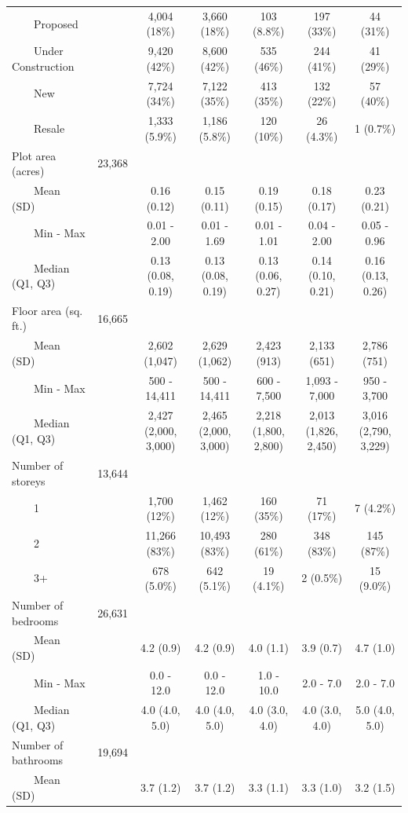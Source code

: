 \documentclass[
  number]{elsarticle}
\begin{document}
\begin{landscape}
\begin{table}
{\begin{tabular*}{\linewidth}{@{\extracolsep{\fill}}lcccccc}
    Proposed &  & 4,004 (18\%) & 3,660 (18\%) & 103 (8.8\%) & 197 (33\%) & 44 (31\%) \\ 
    Under Construction &  & 9,420 (42\%) & 8,600 (42\%) & 535 (46\%) & 244 (41\%) & 41 (29\%) \\ 
    New &  & 7,724 (34\%) & 7,122 (35\%) & 413 (35\%) & 132 (22\%) & 57 (40\%) \\ 
    Resale &  & 1,333 (5.9\%) & 1,186 (5.8\%) & 120 (10\%) & 26 (4.3\%) & 1 (0.7\%) \\ 
Plot area (acres) & 23,368 &  &  &  &  &  \\ 
    Mean (SD) &  & 0.16 (0.12) & 0.15 (0.11) & 0.19 (0.15) & 0.18 (0.17) & 0.23 (0.21) \\ 
    Min - Max &  & 0.01 - 2.00 & 0.01 - 1.69 & 0.01 - 1.01 & 0.04 - 2.00 & 0.05 - 0.96 \\ 
    Median (Q1, Q3) &  & 0.13 (0.08, 0.19) & 0.13 (0.08, 0.19) & 0.13 (0.06, 0.27) & 0.14 (0.10, 0.21) & 0.16 (0.13, 0.26) \\ 
Floor area (sq. ft.) & 16,665 &  &  &  &  &  \\ 
    Mean (SD) &  & 2,602 (1,047) & 2,629 (1,062) & 2,423 (913) & 2,133 (651) & 2,786 (751) \\ 
    Min - Max &  & 500 - 14,411 & 500 - 14,411 & 600 - 7,500 & 1,093 - 7,000 & 950 - 3,700 \\ 
    Median (Q1, Q3) &  & 2,427 (2,000, 3,000) & 2,465 (2,000, 3,000) & 2,218 (1,800, 2,800) & 2,013 (1,826, 2,450) & 3,016 (2,790, 3,229) \\ 
Number of storeys & 13,644 &  &  &  &  &  \\ 
    1 &  & 1,700 (12\%) & 1,462 (12\%) & 160 (35\%) & 71 (17\%) & 7 (4.2\%) \\ 
    2 &  & 11,266 (83\%) & 10,493 (83\%) & 280 (61\%) & 348 (83\%) & 145 (87\%) \\ 
    3+ &  & 678 (5.0\%) & 642 (5.1\%) & 19 (4.1\%) & 2 (0.5\%) & 15 (9.0\%) \\ 
Number of bedrooms & 26,631 &  &  &  &  &  \\ 
    Mean (SD) &  & 4.2 (0.9) & 4.2 (0.9) & 4.0 (1.1) & 3.9 (0.7) & 4.7 (1.0) \\ 
    Min - Max &  & 0.0 - 12.0 & 0.0 - 12.0 & 1.0 - 10.0 & 2.0 - 7.0 & 2.0 - 7.0 \\ 
    Median (Q1, Q3) &  & 4.0 (4.0, 5.0) & 4.0 (4.0, 5.0) & 4.0 (3.0, 4.0) & 4.0 (3.0, 4.0) & 5.0 (4.0, 5.0) \\ 
Number of bathrooms & 19,694 &  &  &  &  &  \\ 
    Mean (SD) &  & 3.7 (1.2) & 3.7 (1.2) & 3.3 (1.1) & 3.3 (1.0) & 3.2 (1.5) \\ 

\end{tabular*}}
\end{table}
\end{landscape}
\end{document}
